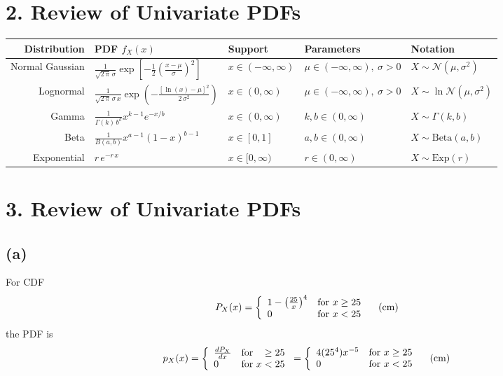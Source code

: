 \documentclass[fleqn, letterpaper]{tufte-handout}
\begin{document}
\section{2. Review of Univariate PDFs}
\begin{table}[h]
	\begin{tabular}{rllll}
	Distribution & PDF $f_X(x)$ & Support & Parameters & Notation \\
	\midrule
	Normal Gaussian
	& $\frac{1}{\sqrt{2 \, \pi} \, \sigma} 
	\exp \left[ -\frac{1}{2} \left( \frac{x - \mu}{\sigma} \right)^2 \right]$
	& $x\in(-\infty,\infty)$
	& $\mu \in (-\infty,\infty),\ \sigma>0$
	& $X\sim\mathcal{N}(\mu,\sigma^2)$ \\
	Lognormal 
	& $\frac{1}{\sqrt{2 \, \pi} \, \sigma \, x}
	\exp \left(-\frac{[\ln(x) - \mu]^2}{2 \, \sigma^2} \right)$
	& $x\in(0,\infty)$
	& $\mu \in (-\infty,\infty),\ \sigma>0$
	& $X\sim\ln\mathcal{N}(\mu,\sigma^2)$ \\
	Gamma \footnotemark
	& $\frac{1}{\Gamma(k) \, b^k} x^{k-1} e^{-x/b}$ 
	& $x\in(0,\infty)$
	& $k,b\in(0,\infty)$
	& $X\sim\Gamma(k,b)$ \\
	Beta \footnotemark
	& $\frac{1}{B(a, b)} x^{a-1} (1 - x)^{b-1}$
	& $x\in[0,1]$
	& $a,b\in(0,\infty)$ 
	& $X\sim\text{Beta}(a,b)$ \\
	Exponential
	& $r \, e^{-r\,x}$
	& $x\in[0,\infty)$
	& $r\in(0,\infty)$
	& $X\sim\text{Exp}(r)$
\end{tabular}
\end{table}
\vspace{3\baselineskip}

\section{3. Review of Univariate PDFs}
\subsection{(a)}
For CDF
\[
	P_X(x)=\left\{
		\begin{array}{l@{\quad\text{for }}r}
			1-\left(\frac{25}{x}\right)^4 & x\geq25 \\
			0 & x<25
		\end{array}
		\right.
		\quad \text{(cm)}
	\] 
the PDF is
\[
	p_X(x)=\left\{
		\begin{array}{l@{\quad\text{for }}r}
			\frac{dP_X}{dx} & \geq25 \\
			0 & x<25
		\end{array}
		\right.
	=\left\{
		\begin{array}{l@{\quad\text{for }}r}
			4(25^4) x^{-5} & x\geq25 \\
			0 & x<25
		\end{array}
		\right.
		\quad \text{(cm)}
	\]
\end{document}
